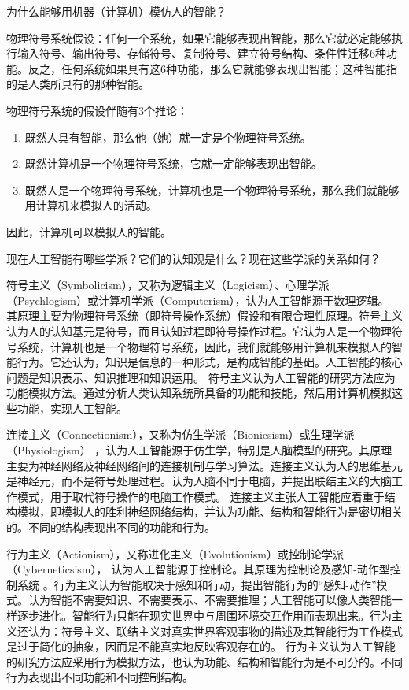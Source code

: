 \begin{question}
为什么能够用机器（计算机）模仿人的智能？
\end{question}
\begin{solution}
物理符号系统假设：任何一个系统，如果它能够表现出智能，那么它就必定能够执行输入符号、输出符号、存储符号、复制符号、建立符号结构、条件性迁移6种功能。反之，任何系统如果具有这6种功能，那么它就能够表现出智能；这种智能指的是人类所具有的那种智能。\par
物理符号系统的假设伴随有3个推论：\par
	\begin{enumerate}
		\item 既然人具有智能，那么他（她）就一定是个物理符号系统。
		\item 既然计算机是一个物理符号系统，它就一定能够表现出智能。
		\item 既然人是一个物理符号系统，计算机也是一个物理符号系统，那么我们就能够用计算机来模拟人的活动。
	\end{enumerate} \par
因此，计算机可以模拟人的智能。
\end{solution}

\begin{question}
现在人工智能有哪些学派？它们的认知观是什么？现在这些学派的关系如何？
\end{question}
\begin{solution}
符号主义（Symbolicism），又称为逻辑主义（Logicism）、心理学派（Psychlogism）或计算机学派（Computerism），认为人工智能源于数理逻辑。 其原理主要为物理符号系统（即符号操作系统）假设和有限合理性原理。符号主义认为人的认知基元是符号，而且认知过程即符号操作过程。它认为人是一个物理符号系统，计算机也是一个物理符号系统，因此，我们就能够用计算机来模拟人的智能行为。它还认为，知识是信息的一种形式，是构成智能的基础。人工智能的核心问题是知识表示、知识推理和知识运用。 符号主义认为人工智能的研究方法应为功能模拟方法。通过分析人类认知系统所具备的功能和技能，然后用计算机模拟这些功能，实现人工智能。\par
连接主义（Connectionism），又称为仿生学派（Bionicsism）或生理学派（Physiologism） ，认为人工智能源于仿生学，特别是人脑模型的研究。其原理主要为神经网络及神经网络间的连接机制与学习算法。连接主义认为人的思维基元是神经元，而不是符号处理过程。认为人脑不同于电脑，并提出联结主义的大脑工作模式，用于取代符号操作的电脑工作模式。 连接主义主张人工智能应着重于结构模拟，即模拟人的胜利神经网络结构，并认为功能、结构和智能行为是密切相关的。不同的结构表现出不同的功能和行为。\par
行为主义（Actionism），又称进化主义（Evolutionism）或控制论学派（Cyberneticsism）， 认为人工智能源于控制论。其原理为控制论及感知-动作型控制系统 。行为主义认为智能取决于感知和行动，提出智能行为的“感知-动作”模式。认为智能不需要知识、不需要表示、不需要推理；人工智能可以像人类智能一样逐步进化。智能行为只能在现实世界中与周围环境交互作用而表现出来。行为主义还认为：符号主义、联结主义对真实世界客观事物的描述及其智能行为工作模式是过于简化的抽象，因而是不能真实地反映客观存在的。 行为主义认为人工智能的研究方法应采用行为模拟方法，也认为功能、结构和智能行为是不可分的。不同行为表现出不同功能和不同控制结构。
\end{solution}

